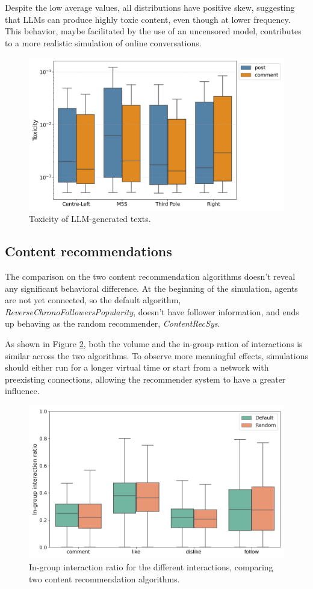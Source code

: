 Despite the low average values, all distributions have positive skew, suggesting that LLMs can produce highly toxic content, even though at lower frequency.
This behavior, maybe facilitated by the use of an uncensored model, contributes to a more realistic simulation of online conversations.


\begin{figure}[h]
    \centering
    \includegraphics[width=1\linewidth]{Images/Toxicity/box_posts_vs_comments.png}
    \caption{Toxicity of LLM-generated texts.}
    \label{fig:toxicity_box}
\end{figure}


\subsection{Content recommendations}
The comparison on the two content recommendation algorithms doesn't reveal any significant behavioral difference.
At the beginning of the simulation, agents are not yet connected, so the default algorithm, \textit{ReverseChronoFollowersPopularity}, doesn't have follower information, and ends up behaving as the random recommender, \textit{ContentRecSys}.

As shown in Figure \ref{fig:recsys_comparison}, both the volume and the in-group ration of interactions is similar across the two algorithms.
To observe more meaningful effects, simulations should either run for a longer virtual time or start from a network with preexisting connections, allowing the recommender system to have a greater influence.


\begin{figure}[h]
    \centering
    \includegraphics[width=1\linewidth]{Images/Recsys/recsys_in_group_ratio.png}
    \caption{In-group interaction ratio for the different interactions, comparing two content recommendation algorithms.}
    \label{fig:recsys_comparison}
\end{figure}